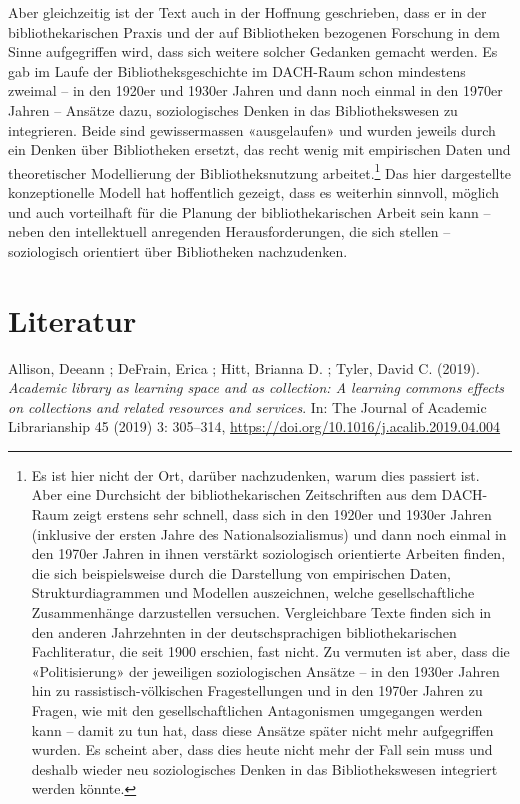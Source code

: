 \documentclass[a4paper,
fontsize=11pt,
oneside,
numbers=noperiodatend,
parskip=half-,
bibliography=totoc,
final
]{scrartcl}
\begin{document}
Aber gleichzeitig ist der Text auch in der Hoffnung geschrieben, dass er
in der bibliothekarischen Praxis und der auf Bibliotheken bezogenen
Forschung in dem Sinne aufgegriffen wird, dass sich weitere solcher
Gedanken gemacht werden. Es gab im Laufe der Bibliotheksgeschichte im
DACH-Raum schon mindestens zweimal -- in den 1920er und 1930er Jahren
und dann noch einmal in den 1970er Jahren -- Ansätze dazu,
soziologisches Denken in das Bibliothekswesen zu integrieren. Beide sind
gewissermassen «ausgelaufen» und wurden jeweils durch ein Denken über
Bibliotheken ersetzt, das recht wenig mit empirischen Daten und
theoretischer Modellierung der Bibliotheksnutzung arbeitet.\footnote{Es
  ist hier nicht der Ort, darüber nachzudenken, warum dies passiert ist.
  Aber eine Durchsicht der bibliothekarischen Zeitschriften aus dem
  DACH-Raum zeigt erstens sehr schnell, dass sich in den 1920er und
  1930er Jahren (inklusive der ersten Jahre des Nationalsozialismus) und
  dann noch einmal in den 1970er Jahren in ihnen verstärkt soziologisch
  orientierte Arbeiten finden, die sich beispielsweise durch die
  Darstellung von empirischen Daten, Strukturdiagrammen und Modellen
  auszeichnen, welche gesellschaftliche Zusammenhänge darzustellen
  versuchen. Vergleichbare Texte finden sich in den anderen Jahrzehnten
  in der deutschsprachigen bibliothekarischen Fachliteratur, die seit
  1900 erschien, fast nicht. Zu vermuten ist aber, dass die
  «Politisierung» der jeweiligen soziologischen Ansätze -- in den 1930er
  Jahren hin zu rassistisch-völkischen Fragestellungen und in den 1970er
  Jahren zu Fragen, wie mit den gesellschaftlichen Antagonismen
  umgegangen werden kann -- damit zu tun hat, dass diese Ansätze später
  nicht mehr aufgegriffen wurden. Es scheint aber, dass dies heute nicht
  mehr der Fall sein muss und deshalb wieder neu soziologisches Denken
  in das Bibliothekswesen integriert werden könnte.} Das hier
dargestellte konzeptionelle Modell hat hoffentlich gezeigt, dass es
weiterhin sinnvoll, möglich und auch vorteilhaft für die Planung der
bibliothekarischen Arbeit sein kann -- neben den intellektuell
anregenden Herausforderungen, die sich stellen -- soziologisch
orientiert über Bibliotheken nachzudenken.

\hypertarget{literatur}{%
\section{Literatur}\label{literatur}}

Allison, Deeann ; DeFrain, Erica ; Hitt, Brianna D. ; Tyler, David C.
(2019). \emph{Academic library as learning space and as collection: A
learning commons\textquotesingle{} effects on collections and related
resources and services}. In: The Journal of Academic Librarianship 45
(2019) 3: 305--314, \url{https://doi.org/10.1016/j.acalib.2019.04.004}
\end{document}
